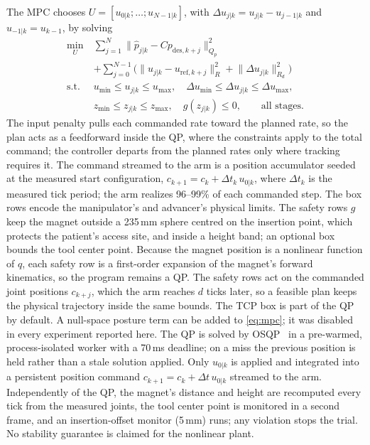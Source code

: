 \documentclass[journal]{IEEEtran}
\begin{document}
The MPC chooses $U=[u_{0|k};\dots;u_{N-1|k}]$, with
$\Delta u_{j|k}=u_{j|k}-u_{j-1|k}$ and $u_{-1|k}=u_{k-1}$, by solving
\begin{equation}
\begin{aligned}
\min_U\ &\sum_{j=1}^{N}\lVert\hat p_{j|k}-Cp_{\mathrm{des},k+j}\rVert_{Q_p}^2\\
&+\sum_{j=0}^{N-1}\Big(\lVert u_{j|k}-u_{\mathrm{ref},k+j}\rVert_R^2
+\lVert\Delta u_{j|k}\rVert_{R_d}^2\Big)\\
\text{s.t.}\ & u_{\min}\le u_{j|k}\le u_{\max},\quad
\Delta u_{\min}\le\Delta u_{j|k}\le\Delta u_{\max},\\
& z_{\min}\le z_{j|k}\le z_{\max},\quad
g(z_{j|k})\le0,\qquad \text{all stages}.
\end{aligned}
\label{eq:mpc}
\end{equation}
The input penalty pulls each commanded rate toward the planned rate, so
the plan acts as a feedforward inside the QP, where the constraints apply
to the total command; the controller departs from the planned rates only
where tracking requires it. The command streamed to the arm is a position
accumulator seeded at the measured start configuration,
$c_{k+1}=c_k+\Delta t_k\,u_{0|k}$, where $\Delta t_k$ is the measured tick
period; the arm realizes 96--99\% of each commanded step.
The box rows encode the manipulator's and advancer's physical limits. The
safety rows $g$ keep the magnet outside a 235\,mm sphere centred on the
insertion point, which protects the patient's access site, and inside a
height band; an optional box bounds the tool center point. Because the
magnet position is a nonlinear function of $q$, each safety row is a
first-order expansion of the magnet's forward kinematics, so the program
remains a QP. The safety rows act on the commanded joint positions
$c_{k+j}$, which the arm reaches $d$ ticks later, so a feasible plan keeps
the physical trajectory inside the same bounds. The TCP box is part of
the QP by default.
A null-space posture term can be added to \eqref{eq:mpc}; it was disabled
in every experiment reported here. The QP is solved by OSQP~\cite{osqp2020}
in a pre-warmed, process-isolated worker with a 70\,ms deadline; on a miss
the previous position is held rather than a stale solution applied. Only
$u_{0|k}$ is applied and integrated into a persistent position command
$c_{k+1}=c_k+\Delta t\,u_{0|k}$ streamed to the arm. Independently of the
QP, the magnet's distance and height are recomputed every tick from the
measured joints, the tool center point is monitored in a second frame, and
an insertion-offset monitor (5\,mm) runs; any violation stops the trial.
No stability guarantee is claimed for the nonlinear plant.
\end{document}
